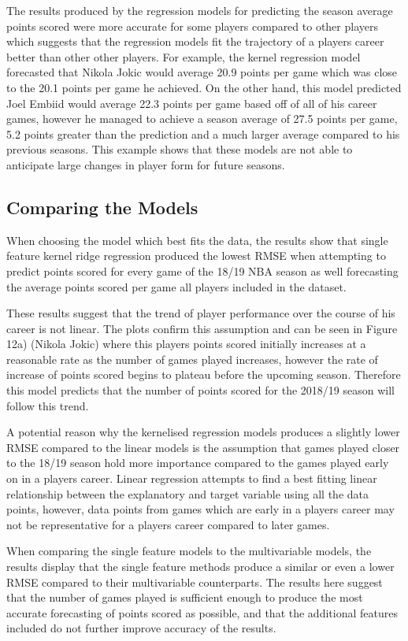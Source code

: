 \documentclass[a4paper,11pt,twoside]{article}
\begin{document}
The results produced by the regression models for predicting the season average points scored were more accurate for some players compared to other players which suggests that the regression models fit the trajectory of a players career better than other other players. For example, the kernel regression model forecasted that Nikola Jokic would average 20.9 points per game which was close to the 20.1 points per game he achieved. On the other hand, this model predicted Joel Embiid would average 22.3 points per game based off of all of his career games, however he managed to achieve a season average of 27.5 points per game, 5.2 points greater than the prediction and a much larger average compared to his previous seasons. This example shows that these models are not able to anticipate large changes in player form for future seasons.


\subsection{Comparing the Models}
When choosing the model which best fits the data, the results show that single feature kernel ridge regression produced the lowest RMSE when attempting to predict points scored for every game of the 18/19 NBA season as well forecasting the average points scored per game all players included in the dataset.

These results suggest that the trend of player performance over the course of his career is not linear. The plots confirm this assumption and can be seen in Figure 12a) (Nikola Jokic) where this players points scored initially increases at a reasonable rate as the number of games played increases, however the rate of increase of points scored begins to plateau before the upcoming season. Therefore this model predicts that the number of points scored for the 2018/19 season will follow this trend.

A potential reason why the kernelised regression models produces a slightly lower RMSE compared to the linear models is the assumption that games played closer to the 18/19 season hold more importance compared to the games played early on in a players career. Linear regression attempts to find a best fitting linear relationship between the explanatory and target variable using all the data points, however, data points from games which are early in a players career may not be representative for a players career compared to later games.

When comparing the single feature models to the multivariable models, the results display that the single feature methods produce a similar or even a lower RMSE compared to their multivariable counterparts. The results here suggest that the number of games played is sufficient enough to produce the most accurate forecasting of points scored as possible, and that the additional features included do not further improve accuracy of the results.
\end{document}
